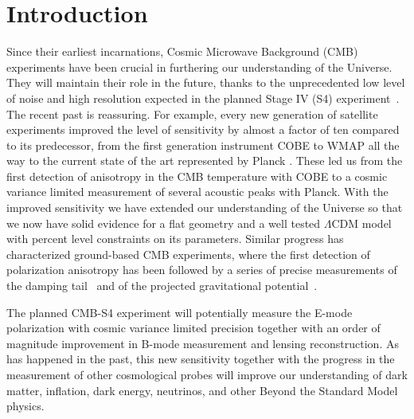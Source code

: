 \documentclass[aps,prd,reprint,superscriptaddress,nofootinbib,floatfix]{revtex4-1}
\begin{document}
\section{Introduction}\label{sec:intro}
Since their earliest incarnations, Cosmic Microwave Background (CMB) experiments have been crucial in furthering our understanding of the Universe. They will maintain their role in the future, thanks to the unprecedented low level of noise and high resolution expected in the planned Stage IV (S4) experiment~\cite{2013arXiv1309.5383A}.
The recent past is reassuring. For example, every new generation of satellite experiments improved the level of sensitivity by almost a factor of ten compared to its predecessor, from the first generation instrument COBE to WMAP all the way to the current state of the art represented by Planck \cite{fixsen:1996,BlueBook2005, bennett:2003}. 
These led us from the first detection of anisotropy in the CMB temperature with COBE to a cosmic variance limited measurement of several acoustic peaks with Planck. With the improved sensitivity we have extended our understanding of the Universe so that we now have solid evidence for a flat geometry and a well tested $\Lambda$CDM model  with percent level constraints on its parameters.
Similar progress has characterized ground-based CMB experiments, where the first detection of polarization anisotropy \cite{2002ApJ...568...38H} has been followed by a series of precise measurements of the damping tail~\cite{2011ApJ...739...52D,2011ApJ...743...28K} and of the projected gravitational potential~\cite{2011PhRvL.107b1301D,2012ApJ...756..142V}.

The planned CMB-S4 experiment will potentially measure the E-mode polarization with cosmic variance limited precision together with an order of magnitude improvement in B-mode measurement and lensing reconstruction. As has happened in the past, this new sensitivity together with the progress in the measurement of other cosmological probes will improve our understanding of dark matter, inflation, dark energy, neutrinos, and other  Beyond the Standard Model physics.
\end{document}
